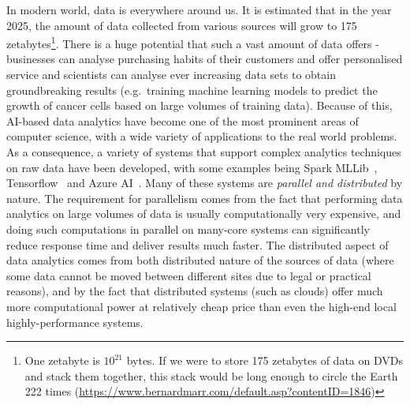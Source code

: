 \documentclass[a4paper,11pt]{article}
\begin{document}
In modern world, data is everywhere around us. It is estimated that in the year 2025, the amount of data collected from various sources will grow to 175 zetabytes\footnote{One zetabyte is $10^{21}$ bytes. If we were to store 175 zetabytes of data on DVDs and stack them together, this stack would be long enough to circle the Earth 222 times (\url{https://www.bernardmarr.com/default.asp?contentID=1846})}. There is a huge potential  that such a vast amount of data offers - businesses can analyse purchasing habits of their customers and offer personalised service and scientists can analyse ever increasing data sets to obtain groundbreaking results (e.g.~training machine learning models to predict the growth of cancer cells based on large volumes of training data). Because of this, AI-based data analytics have become one of the most prominent areas of computer science, with a wide variety of applications to the real world problems. As a consequence, a variety of systems that support complex analytics techniques on raw data have been developed, with some examples being Spark MLLib~\cite{mllib}, Tensorflow~\cite{tensorflow} and Azure AI~\cite{azureAI}. Many of these systems are \emph{parallel and distributed} by nature. The requirement for parallelism comes from the fact that performing data analytics on large volumes of data is usually computationally very expensive, and doing such computations in parallel on many-core systems can significantly reduce response time and deliver results much faster. The distributed aspect of data analytics comes from both distributed nature of the sources of data (where some data cannot be moved between different sites due to legal or practical reasons), and by the fact that distributed systems (such as clouds) offer much more computational power at relatively cheap price than even the high-end local highly-performance systems. 
\end{document}
